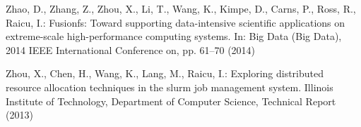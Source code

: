 \documentclass[runningheads,a4paper]{llncs}
\begin{document}
\begin{thebibliography}{10}
Zhao, D., Zhang, Z., Zhou, X., Li, T., Wang, K., Kimpe, D., Carns, P., Ross,
  R., Raicu, I.: Fusionfs: Toward supporting data-intensive scientific
  applications on extreme-scale high-performance computing systems.
\newblock In: Big Data (Big Data), 2014 IEEE International Conference on, pp.
  61--70 (2014)

Zhou, X., Chen, H., Wang, K., Lang, M., Raicu, I.: Exploring distributed
  resource allocation techniques in the slurm job management system.
\newblock Illinois Institute of Technology, Department of Computer Science,
  Technical Report  (2013)

\end{thebibliography}
\end{document}
